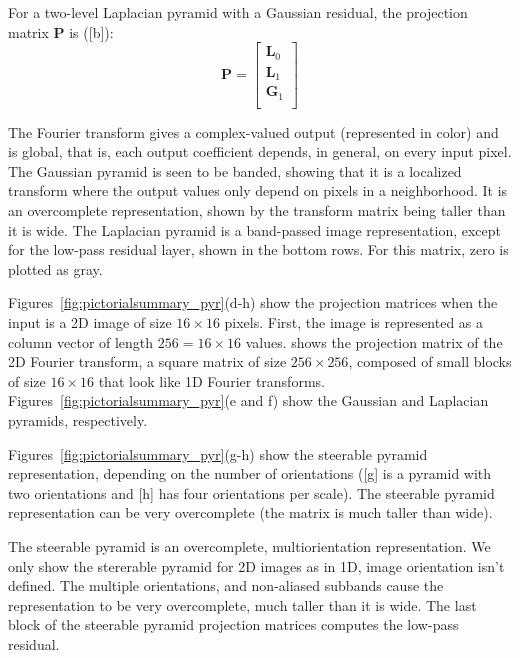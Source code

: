 For a two-level Laplacian pyramid with a Gaussian residual, the projection matrix $\mathbf{P}$ is (\fig{\ref{fig:pictorialsummary_pyr}}[b]): 
\begin{equation}
    \mathbf{P} =  
    \begin{bmatrix}
    \mathbf{L}_0 \\
    \mathbf{L}_1 \\
    \mathbf{G}_1 \\
    \end{bmatrix}
\end{equation}

The Fourier transform gives a complex-valued output (represented in color) and is global, that is, each output coefficient depends, in general, on every input pixel. The Gaussian pyramid is seen to be banded, showing that it is a localized transform where the output values only depend on pixels in a neighborhood.  It is an overcomplete representation, shown by the transform matrix being taller than it is wide. The Laplacian pyramid is a band-passed image representation, except for the low-pass residual layer, shown in the bottom rows. For this matrix, zero is plotted as gray.  

Figures~\ref{fig:pictorialsummary_pyr}(d-h) show the projection matrices when the input is a 2D image of size $16\times16$ pixels. First, the image is represented as a column vector of length $256=16\times16$ values.  shows the projection matrix of the 2D Fourier transform, a square matrix of size $256\times256$, composed of small blocks of size $16\times16$ that look like 1D Fourier transforms.  Figures~\ref{fig:pictorialsummary_pyr}(e and f) show the Gaussian and Laplacian pyramids, respectively. 

Figures~\ref{fig:pictorialsummary_pyr}(g-h) show the steerable pyramid representation, depending on the number of orientations (\fig{\ref{fig:pictorialsummary_pyr}}[g] is a pyramid with two orientations and \fig{\ref{fig:pictorialsummary_pyr}}[h] has four orientations per scale). The steerable pyramid representation can be very overcomplete (the matrix is much taller than wide). 


The steerable pyramid is an overcomplete, multiorientation representation. We only show the stererable pyramid for 2D images as in 1D, image orientation isn't defined.  The multiple orientations, and non-aliased subbands cause the representation to be very overcomplete, much taller than it is wide. The last block of the steerable pyramid projection matrices computes the low-pass residual.

